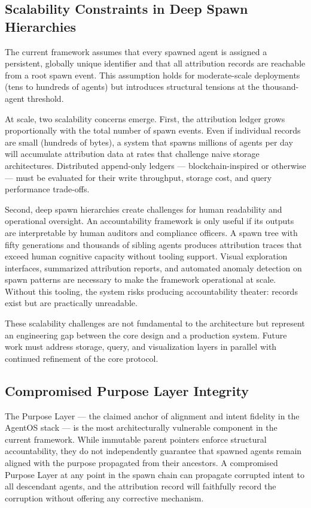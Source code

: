 \subsection{Scalability Constraints in Deep Spawn Hierarchies}
\label{sec:limitations:scalability}

The current framework assumes that every spawned agent is assigned a persistent, globally unique identifier and that all attribution records are reachable from a root spawn event. This assumption holds for moderate-scale deployments (tens to hundreds of agents) but introduces structural tensions at the thousand-agent threshold.

At scale, two scalability concerns emerge. First, the attribution ledger grows proportionally with the total number of spawn events. Even if individual records are small (hundreds of bytes), a system that spawns millions of agents per day will accumulate attribution data at rates that challenge naive storage architectures. Distributed append-only ledgers — blockchain-inspired or otherwise — must be evaluated for their write throughput, storage cost, and query performance trade-offs.

Second, deep spawn hierarchies create challenges for human readability and operational oversight. An accountability framework is only useful if its outputs are interpretable by human auditors and compliance officers. A spawn tree with fifty generations and thousands of sibling agents produces attribution traces that exceed human cognitive capacity without tooling support. Visual exploration interfaces, summarized attribution reports, and automated anomaly detection on spawn patterns are necessary to make the framework operational at scale. Without this tooling, the system risks producing accountability theater: records exist but are practically unreadable.

These scalability challenges are not fundamental to the architecture but represent an engineering gap between the core design and a production system. Future work must address storage, query, and visualization layers in parallel with continued refinement of the core protocol.

\subsection{Compromised Purpose Layer Integrity}
\label{sec:limitations:purpose}

The Purpose Layer — the claimed anchor of alignment and intent fidelity in the AgentOS stack — is the most architecturally vulnerable component in the current framework. While immutable parent pointers enforce structural accountability, they do not independently guarantee that spawned agents remain aligned with the purpose propagated from their ancestors. A compromised Purpose Layer at any point in the spawn chain can propagate corrupted intent to all descendant agents, and the attribution record will faithfully record the corruption without offering any corrective mechanism.

